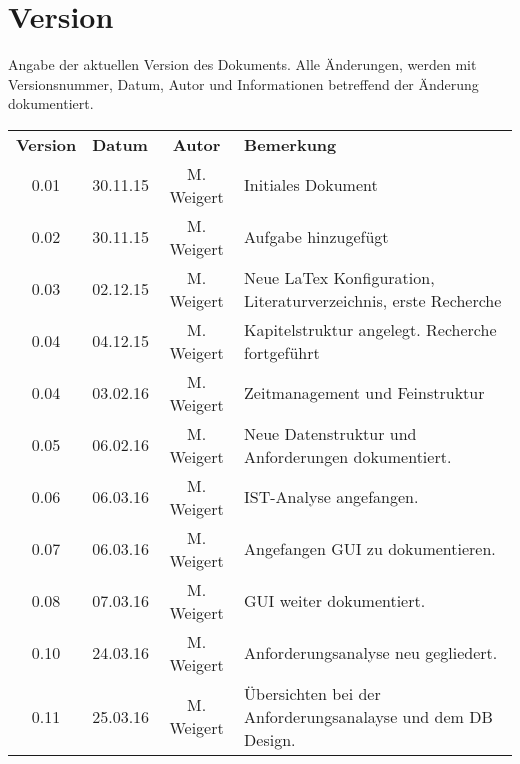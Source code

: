 \chapter*{Version}

Angabe der aktuellen Version des Dokuments. Alle Änderungen, werden mit Versionsnummer, Datum, Autor und Informationen betreffend der Änderung dokumentiert.\\

\begin{tabular}{|c|l|c|l|}
	\rowcolor{black} {\color{white}\textbf{Version}} & {\color{white}\textbf{Datum}} & {\color{white}\textbf{Autor}} & {\color{white}\textbf{Bemerkung}} \\
	0.01 & 30.11.15 & M. Weigert & Initiales Dokument \\ \hline
	\rowcolor{DarkSeaGreen} 0.02 & 30.11.15 & M. Weigert & Aufgabe hinzugefügt \\ \hline
	0.03 & 02.12.15 & M. Weigert & Neue LaTex Konfiguration, Literaturverzeichnis, erste Recherche \\ \hline
	\rowcolor{DarkSeaGreen} 0.04 & 04.12.15 & M. Weigert & Kapitelstruktur angelegt. Recherche fortgeführt \\ \hline
	0.04 & 03.02.16 & M. Weigert & Zeitmanagement und Feinstruktur \\ \hline
	\rowcolor{DarkSeaGreen} 0.05 & 06.02.16 & M. Weigert & Neue Datenstruktur und Anforderungen dokumentiert. \\ \hline
	0.06 & 06.03.16 & M. Weigert & IST-Analyse angefangen. \\ \hline
	\rowcolor{DarkSeaGreen} 0.07 & 06.03.16 & M. Weigert & Angefangen GUI zu dokumentieren. \\ \hline
	0.08 & 07.03.16 & M. Weigert & GUI weiter dokumentiert. \\ \hline
	\rowcolor{DarkSeaGreen} 0.10 & 24.03.16 & M. Weigert & Anforderungsanalyse neu gegliedert. \\ \hline
	0.11 & 25.03.16 & M. Weigert & Übersichten bei der Anforderungsanalayse und dem DB Design. \\ \hline
\end{tabular}